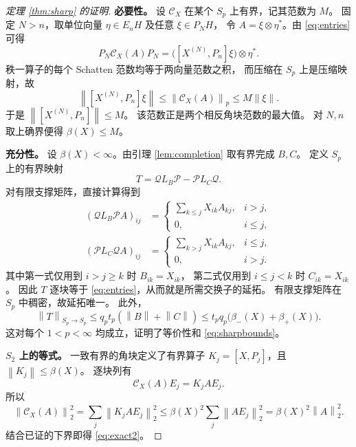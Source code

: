 \documentclass[UTF8,11pt,a4paper,fontset=fandol]{ctexart}
\theoremstyle{remark}
\newcommand{\PP}{\mathcal P}
\newcommand{\QQ}{\mathcal Q}
\newcommand{\CC}{\mathcal C}
\newcommand{\norm}[1]{\left\lVert #1\right\rVert}
\begin{document}
\begin{proof}[定理 \ref{thm:sharp} 的证明]
\textbf{必要性。}
设 $\CC_X$ 在某个 $S_p$ 上有界，记其范数为 $M$。
固定 $N>n$，取单位向量 $\eta\in E_nH$ 及任意 $\xi\in P_NH$，
令 $A=\xi\otimes\eta^*$。由 \eqref{eq:entries} 可得
\[
 P_N\CC_X(A)P_N
 =\bigl([X^{(N)},P_n]\xi\bigr)\otimes\eta^*.
\]
秩一算子的每个 Schatten 范数均等于两向量范数之积，
而压缩在 $S_p$ 上是压缩映射，故
\[
 \norm{[X^{(N)},P_n]\xi}
 \leq\norm{\CC_X(A)}_p\leq M\norm\xi.
\]
于是 $\norm{[X^{(N)},P_n]}\leq M$。
该范数正是两个相反角块范数的最大值。
对 $N,n$ 取上确界便得 $\beta(X)\leq M$。

\medskip
\textbf{充分性。}
设 $\beta(X)<\infty$。由引理 \ref{lem:completion} 取有界完成 $B,C$。
定义 $S_p$ 上的有界映射
\begin{equation}\label{eq:factorization}
 T=\QQ L_B\PP-\PP L_C\QQ.
\end{equation}
对有限支撑矩阵，直接计算得到
\begin{align*}
 (\QQ L_B\PP A)_{ij}
 &=\begin{cases}
     \displaystyle\sum_{k\leq j}X_{ik}A_{kj},&i>j,\\
     0,&i\leq j,
   \end{cases}\\
 (\PP L_C\QQ A)_{ij}
 &=\begin{cases}
     \displaystyle\sum_{k>j}X_{ik}A_{kj},&i\leq j,\\
     0,&i>j.
   \end{cases}
\end{align*}
其中第一式仅用到 $i>j\geq k$ 时 $B_{ik}=X_{ik}$，
第二式仅用到 $i\leq j<k$ 时 $C_{ik}=X_{ik}$。
因此 $T$ 逐块等于 \eqref{eq:entries}，从而就是所需交换子的延拓。
有限支撑矩阵在 $S_p$ 中稠密，故延拓唯一。
此外，
\[
 \norm T_{S_p\to S_p}
 \leq q_pt_p(\norm B+\norm C)
 \leq t_pq_p\bigl(\beta_-(X)+\beta_+(X)\bigr).
\]
这对每个 $1<p<\infty$ 均成立，证明了等价性和 \eqref{eq:sharpbounds}。

\medskip
\textbf{$S_2$ 上的等式。}
一致有界的角块定义了有界算子 $K_j=[X,P_j]$，且
$\norm{K_j}\leq\beta(X)$。
逐块列有
\[
 \CC_X(A)E_j=K_jAE_j.
\]
所以
\[
 \norm{\CC_X(A)}_2^2
 =\sum_j\norm{K_jAE_j}_2^2
 \leq\beta(X)^2\sum_j\norm{AE_j}_2^2
 =\beta(X)^2\norm A_2^2.
\]
结合已证的下界即得 \eqref{eq:exact2}。
\end{proof}
\end{document}
